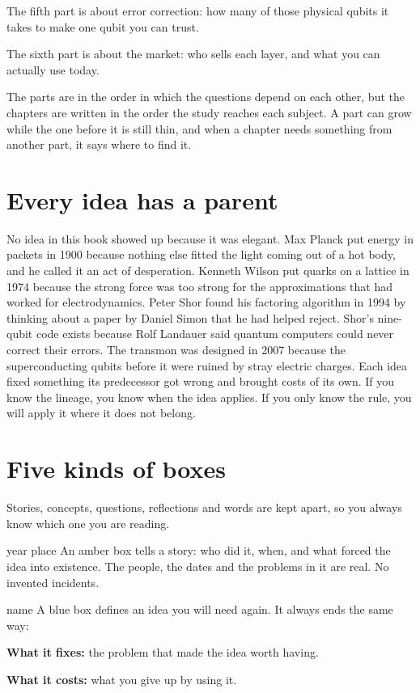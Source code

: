 The fifth part is about error correction: how many of those physical qubits it takes
to make one qubit you can trust.

The sixth part is about the market: who sells each layer, and what you can actually
use today.

The parts are in the order in which the questions depend on each other, but the
chapters are written in the order the study reaches each subject. A part can grow
while the one before it is still thin, and when a chapter needs something from
another part, it says where to find it.

\section*{Every idea has a parent}

No idea in this book showed up because it was elegant. Max Planck put energy in
packets in 1900 because nothing else fitted the light coming out of a hot body, and
he called it an act of desperation. Kenneth Wilson put quarks on a lattice in 1974
because the strong force was too strong for the approximations that had worked for
electrodynamics. Peter Shor found his factoring algorithm in 1994 by thinking about a
paper by Daniel Simon that he had helped reject. Shor's nine-qubit code exists because
Rolf Landauer said quantum computers could never correct their errors. The transmon
was designed in 2007 because the superconducting qubits before it were ruined by stray
electric charges. Each idea fixed something its predecessor got wrong and brought
costs of its own. If you know the lineage, you know when the idea applies. If you only
know the rule, you will apply it where it does not belong.

\section*{Five kinds of boxes}

Stories, concepts, questions, reflections and words are kept apart, so you
always know which one you are reading.

\begin{history}{year \textperiodcentered{} place}
An amber box tells a story: who did it, when, and what forced the idea into
existence. The people, the dates and the problems in it are real. No invented
incidents.
\end{history}

\begin{concept}{name}
A blue box defines an idea you will need again. It always ends the same way:

\textbf{What it fixes:} the problem that made the idea worth having.

\textbf{What it costs:} what you give up by using it.
\end{concept}


